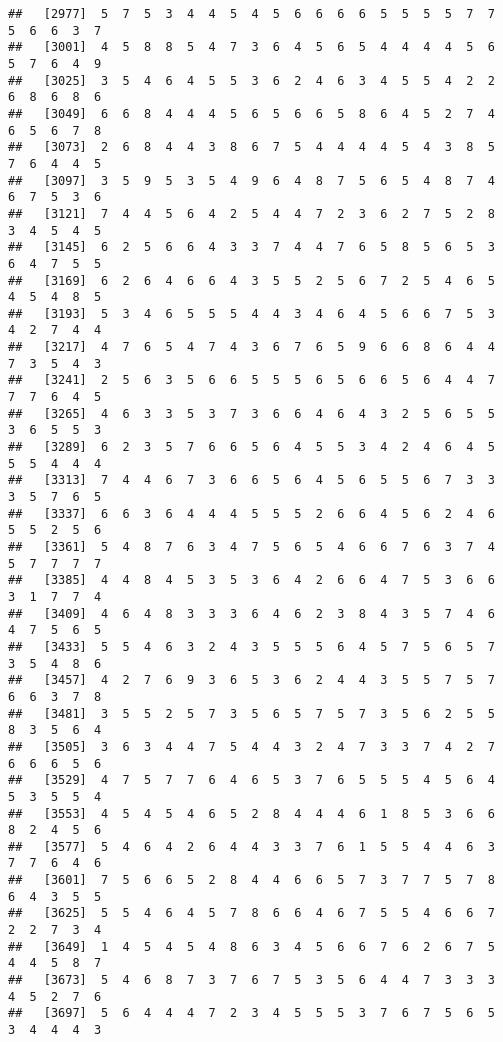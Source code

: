 \documentclass[
]{book}
\begin{document}
\begin{verbatim}
##   [2977]  5  7  5  3  4  4  5  4  5  6  6  6  6  5  5  5  5  7  7  5  6  6  3  7
##   [3001]  4  5  8  8  5  4  7  3  6  4  5  6  5  4  4  4  4  5  6  5  7  6  4  9
##   [3025]  3  5  4  6  4  5  5  3  6  2  4  6  3  4  5  5  4  2  2  6  8  6  8  6
##   [3049]  6  6  8  4  4  4  5  6  5  6  6  5  8  6  4  5  2  7  4  6  5  6  7  8
##   [3073]  2  6  8  4  4  3  8  6  7  5  4  4  4  4  5  4  3  8  5  7  6  4  4  5
##   [3097]  3  5  9  5  3  5  4  9  6  4  8  7  5  6  5  4  8  7  4  6  7  5  3  6
##   [3121]  7  4  4  5  6  4  2  5  4  4  7  2  3  6  2  7  5  2  8  3  4  5  4  5
##   [3145]  6  2  5  6  6  4  3  3  7  4  4  7  6  5  8  5  6  5  3  6  4  7  5  5
##   [3169]  6  2  6  4  6  6  4  3  5  5  2  5  6  7  2  5  4  6  5  4  5  4  8  5
##   [3193]  5  3  4  6  5  5  5  4  4  3  4  6  4  5  6  6  7  5  3  4  2  7  4  4
##   [3217]  4  7  6  5  4  7  4  3  6  7  6  5  9  6  6  8  6  4  4  7  3  5  4  3
##   [3241]  2  5  6  3  5  6  6  5  5  5  6  5  6  6  5  6  4  4  7  7  7  6  4  5
##   [3265]  4  6  3  3  5  3  7  3  6  6  4  6  4  3  2  5  6  5  5  3  6  5  5  3
##   [3289]  6  2  3  5  7  6  6  5  6  4  5  5  3  4  2  4  6  4  5  5  5  4  4  4
##   [3313]  7  4  4  6  7  3  6  6  5  6  4  5  6  5  5  6  7  3  3  3  5  7  6  5
##   [3337]  6  6  3  6  4  4  4  5  5  5  2  6  6  4  5  6  2  4  6  5  5  2  5  6
##   [3361]  5  4  8  7  6  3  4  7  5  6  5  4  6  6  7  6  3  7  4  5  7  7  7  7
##   [3385]  4  4  8  4  5  3  5  3  6  4  2  6  6  4  7  5  3  6  6  3  1  7  7  4
##   [3409]  4  6  4  8  3  3  3  6  4  6  2  3  8  4  3  5  7  4  6  4  7  5  6  5
##   [3433]  5  5  4  6  3  2  4  3  5  5  5  6  4  5  7  5  6  5  7  3  5  4  8  6
##   [3457]  4  2  7  6  9  3  6  5  3  6  2  4  4  3  5  5  7  5  7  6  6  3  7  8
##   [3481]  3  5  5  2  5  7  3  5  6  5  7  5  7  3  5  6  2  5  5  8  3  5  6  4
##   [3505]  3  6  3  4  4  7  5  4  4  3  2  4  7  3  3  7  4  2  7  6  6  6  5  6
##   [3529]  4  7  5  7  7  6  4  6  5  3  7  6  5  5  5  4  5  6  4  5  3  5  5  4
##   [3553]  4  5  4  5  4  6  5  2  8  4  4  4  6  1  8  5  3  6  6  8  2  4  5  6
##   [3577]  5  4  6  4  2  6  4  4  3  3  7  6  1  5  5  4  4  6  3  7  7  6  4  6
##   [3601]  7  5  6  6  5  2  8  4  4  6  6  5  7  3  7  7  5  7  8  6  4  3  5  5
##   [3625]  5  5  4  6  4  5  7  8  6  6  4  6  7  5  5  4  6  6  7  2  2  7  3  4
##   [3649]  1  4  5  4  5  4  8  6  3  4  5  6  6  7  6  2  6  7  5  4  4  5  8  7
##   [3673]  5  4  6  8  7  3  7  6  7  5  3  5  6  4  4  7  3  3  3  4  5  2  7  6
##   [3697]  5  6  4  4  4  7  2  3  4  5  5  5  3  7  6  7  5  6  5  3  4  4  4  3

\end{verbatim}
\end{document}
